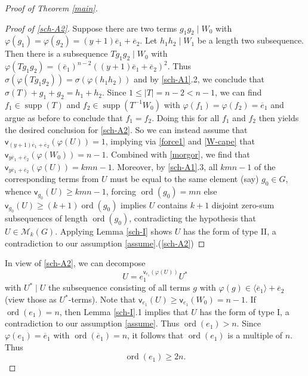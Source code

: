 \documentclass[11pt]{amsart}
\theoremstyle{definition}
\DeclareMathOperator{\ord}{ord}
\DeclareMathOperator{\supp}{supp}
\newcommand{\la}{\langle}
\newcommand{\ra}{\rangle}
\newcommand{\be}{\begin{equation}}
\newcommand{\ee}{\end{equation}}
\newcommand{\vp}{\mathsf v}
\numberwithin{equation}{section}
\begin{document}
\begin{proof}[Proof of Theorem \ref{main}]
\begin{proof}[Proof of \ref{sch-A2}]
		Suppose there are two terms $g_1 g_2\mid W_0$ with $\varphi(g_1)=\varphi(g_2)=(y+1)\overline e_1+\overline e_2$. Let $h_1 h_2\mid W_1$ be a length two subsequence. Then there is a subsequence $T g_1 g_2\mid W_0$ with $\varphi(T g_1 g_2)=(\overline e_1)^{n-2} ((y+1)\overline e_1+\overline e_2)^2$. Thus $\sigma(\varphi(T g_1 g_2))=\sigma(\varphi(h_1 h_2))$ and  by \ref{sch-A1}.2, we conclude that $\sigma(T)+g_1+g_2=h_1+h_2$. Since $1\leq |T|=n-2<n-1$, we can find $f_1\in \supp(T)$ and $f_2\in \supp(T^{-1} W_0)$ with $\varphi(f_1)=\varphi(f_2)=\overline e_1$ and argue as before to conclude that $f_1=f_2$. Doing this for all $f_1$ and $f_2$ then yields the desired conclusion for \ref{sch-A2}. So we can instead assume that $\vp_{(y+1)\overline e_1+\overline e_2}(\varphi(U))=1$, implying via \eqref{force1} and \eqref{W-cape} that
		$\vp_{y\overline e_1+\overline e_2}(\varphi(W_0))=n-1$. Combined with \eqref{morgor}, we find that $\vp_{y\overline e_1+\overline e_2}(\varphi(U))=kmn-1$. Moreover, by \ref{sch-A1}.3, all $kmn-1$ of the corresponding terms from $U$ must be equal to the same element (say) $g_0\in G$, whence $\vp_{g_0}(U)\geq kmn-1$, forcing $\ord(g_0)=mn$ else  $\vp_{g_0}(U)\ge (k+1)\ord(g_0)$ implies $U$ contains $k+1$ disjoint zero-sum subsequences of length $\ord(g_0)$, contradicting the hypothesis that $U\in \mathcal M_k(G)$. Applying Lemma \ref{sch-I} shows  $U$ has the form of type II, a contradiction to our assumption \eqref{assume}.\qedhere (\ref{sch-A2})
	\end{proof}
	
	
	In view of \ref{sch-A2},
	we can decompose $$U=e_1^{\mathsf v_{\overline e_1}(\varphi(U))} U^*$$ with  $U^*\mid U$ the subsequence consisting of all terms $g$ with $\varphi(g)\in\la \overline e_1\ra+\overline e_2$ (view those as $U^*$-terms).	
	Note that $\vp_{e_1}(U)\geq \vp_{e_1}(W_0)= n-1$. If $\ord(e_1)=n$, then Lemma \ref{sch-I}.1 implies that $U$ has the form of type I, a contradiction to our assumption \eqref{assume}. Thus $\ord(e_1)>n$. Since $\varphi(e_1)=\overline e_1$ with $\ord(\overline e_1)=n$, it follows that $\ord(e_1)$ is a  multiple of $n$. Thus
	\be\label{ge_2n}\ord(e_1)\geq 2n.\ee
	

\end{proof}
\end{document}
